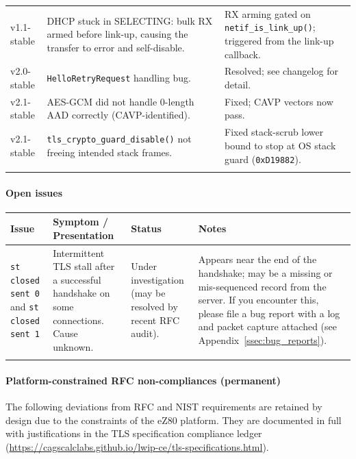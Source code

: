 \documentclass[titlepage]{report}
\renewcommand{\arraystretch}{1.5}
\begin{document}
\begin{longtable}{@{}>{\raggedright\arraybackslash}p{}>{\raggedright\arraybackslash}p{}>{\raggedright\arraybackslash}p{}@{}}
		\addlinespace
		v1.1-stable
		& DHCP stuck in SELECTING: bulk RX armed before link-up, causing the transfer to error and self-disable.
		& RX arming gated on \texttt{netif\_is\_link\_up()}; triggered from the link-up callback. \\
		\addlinespace
		v2.0-stable
		& \texttt{HelloRetryRequest} handling bug.
		& Resolved; see changelog for detail. \\
		\addlinespace
		v2.1-stable
		& AES-GCM did not handle 0-length AAD correctly (CAVP-identified).
		& Fixed; CAVP vectors now pass. \\
		\addlinespace
		v2.1-stable
		& \texttt{tls\_crypto\_guard\_disable()} not freeing intended stack frames.
		& Fixed stack-scrub lower bound to stop at OS stack guard (\texttt{0xD19882}). \\
		\addlinespace
	\end{longtable}

	\paragraph{Open issues}

	\renewcommand{\arraystretch}{1.3}
	\begin{longtable}{@{}>{\raggedright\arraybackslash}p{}>{\raggedright\arraybackslash}p{}>{\raggedright\arraybackslash}p{}>{\raggedright\arraybackslash}p{}@{}}
		\toprule
		\textbf{Issue} & \textbf{Symptom / Presentation} & \textbf{Status} & \textbf{Notes} \\
		\midrule
		\endhead
		\texttt{st closed sent 0} and \texttt{st closed sent 1}
		&
		Intermittent TLS stall after a successful handshake on some connections. Cause unknown.
		&
		Under investigation (may be resolved by recent RFC audit).
		&
		Appears near the end of the handshake; may be a missing or mis-sequenced record from the server. If you encounter this, please file a bug report with a log and packet capture attached (see Appendix~\ref{ssec:bug_reports}). \\
		\addlinespace
	\end{longtable}

	\paragraph{Platform-constrained RFC non-compliances (permanent)}

	The following deviations from RFC and NIST requirements are retained by design due to the constraints of the eZ80 platform. They are documented in full with justifications in the TLS specification compliance ledger (\url{https://cagscalclabs.github.io/lwip-ce/tls-specifications.html}).
\end{document}
